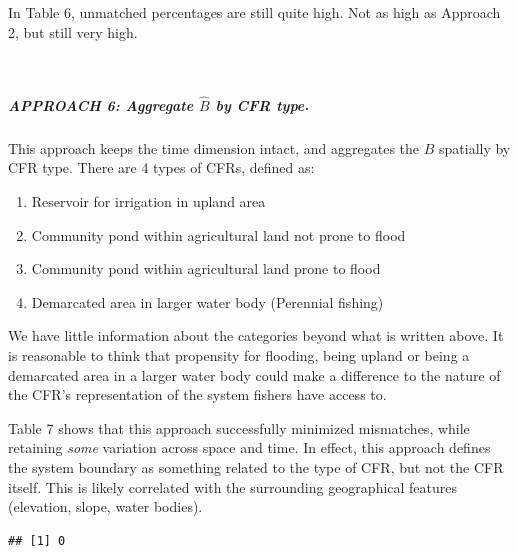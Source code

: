 \documentclass[
]{article}
\providecommand{\tightlist}{%
  \setlength{\itemsep}{0pt}\setlength{\parskip}{0pt}}
\begin{document}
In Table 6, unmatched percentages are still quite high. Not as high as
Approach 2, but still very high.\\
\strut \\

\hypertarget{approach-6-aggregate-hatb-by-cfr-type.}{%
\subparagraph{\texorpdfstring{\textbf{APPROACH 6: Aggregate \(\hat{B}\)
by CFR
type}.}{APPROACH 6: Aggregate \textbackslash hat\{B\} by CFR type.}}\label{approach-6-aggregate-hatb-by-cfr-type.}}

\hfill\break
\hfill\break
This approach keeps the time dimension intact, and aggregates the
\(\hat{B}\) spatially by CFR type. There are 4 types of CFRs, defined
as:

\begin{enumerate}
\def\labelenumi{\arabic{enumi}.}
\tightlist
\item
  Reservoir for irrigation in upland area
\item
  Community pond within agricultural land not prone to flood
\item
  Community pond within agricultural land prone to flood
\item
  Demarcated area in larger water body (Perennial fishing)
\end{enumerate}

We have little information about the categories beyond what is written
above. It is reasonable to think that propensity for flooding, being
upland or being a demarcated area in a larger water body could make a
difference to the nature of the CFR's representation of the system
fishers have access to.

Table 7 shows that this approach successfully minimized mismatches,
while retaining \emph{some} variation across space and time. In effect,
this approach defines the system boundary as something related to the
type of CFR, but not the CFR itself. This is likely correlated with the
surrounding geographical features (elevation, slope, water bodies).

\begin{verbatim}
## [1] 0
\end{verbatim}
\end{document}
